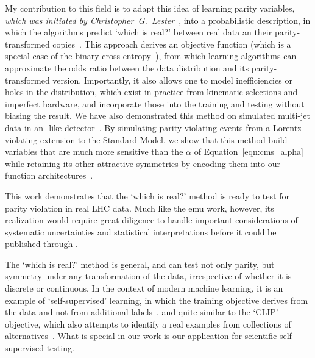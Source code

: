My contribution to this field is to adapt this idea of learning parity
variables,
\emph{which was initiated by Christopher~G.~Lester}~\cite{lester2021stressed},
into a probabilistic description, in which the algorithms predict
`which is real?' between real data an their parity-transformed
copies~\cite{tombs2021which}.
This approach derives an objective function
(which is a special case of the binary
cross-entropy~\cite{MurphyKevinP.2012Mlap}),
from which learning algorithms
can approximate the odds ratio between the data distribution and its
parity-transformed version.
Importantly, it also allows one to model inefficiencies or holes in the
distribution, which exist in practice from kinematic selections and imperfect
hardware, and incorporate those into the training and testing without biasing
the result.
We have also demonstrated this method on simulated multi-jet data in an
\atlas-like detector~\cite{lester2022hunting}.
By simulating parity-violating events from a Lorentz-violating extension
to the Standard Model, we show that this method build variables that are much
more sensitive than the $\alpha$ of Equation~\ref{eqn:cms_alpha} while
retaining its other attractive symmetries by encoding them into our function
architectures~\cite{lester2021stressed, tombs2021which}.

This work demonstrates that the `which is real?' method is ready to test for
parity violation in real LHC data.
Much like the emu work, however, its realization would require great diligence
to handle important considerations of systematic uncertainties and statistical
interpretations before it could be published through \atlas.

The `which is real?' method is general, and can test not only parity, but
symmetry under any transformation of the data, irrespective of whether it is
discrete or continuous.
In the context of modern machine learning, it is an example of
`self-supervised' learning, in which the training objective derives from the
data and not from additional labels~\cite{
Noroozi2016jigsaw,
multitaskself2017,
devlin2019bert
}, and quite similar to the `CLIP' objective, which also attempts to identify
a real examples from collections of alternatives~\cite{pmlr-v139-radford21a}.
What is special in our work is our application for scientific self-supervised
testing.

